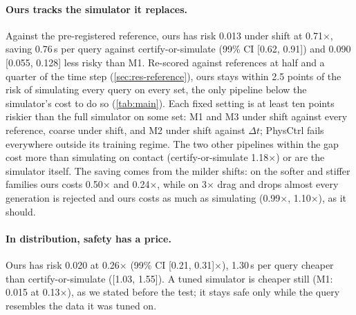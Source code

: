 \paragraph{Ours tracks the simulator it replaces.}
Against the pre-registered reference, ours has risk 0.013 under shift at 0.71$\times$, saving 0.76\,s per query against certify-or-simulate (99\% CI [0.62, 0.91]) and 0.090 [0.055, 0.128] less risky than M1.
Re-scored against references at half and a quarter of the time step (\cref{sec:res-reference}), ours stays within 2.5 points of the risk of simulating every query on every set, the only pipeline below the simulator's cost to do so (\cref{tab:main}).
Each fixed setting is at least ten points riskier than the full simulator on some set: M1 and M3 under shift against every reference, coarse under shift, and M2 under shift against $\Delta t$; PhysCtrl fails everywhere outside its training regime.
The two other pipelines within the gap cost more than simulating on contact (certify-or-simulate 1.18$\times$) or are the simulator itself.
The saving comes from the milder shifts: on the softer and stiffer families ours costs 0.50$\times$ and 0.24$\times$, while on 3$\times$ drag and drops almost every generation is rejected and ours costs as much as simulating (0.99$\times$, 1.10$\times$), as it should.

\paragraph{In distribution, safety has a price.}
Ours has risk 0.020 at 0.26$\times$ (99\% CI [0.21, 0.31]$\times$), 1.30\,s per query cheaper than certify-or-simulate ([1.03, 1.55]).
A tuned simulator is cheaper still (M1: 0.015 at 0.13$\times$), as we stated before the test; it stays safe only while the query resembles the data it was tuned on.

